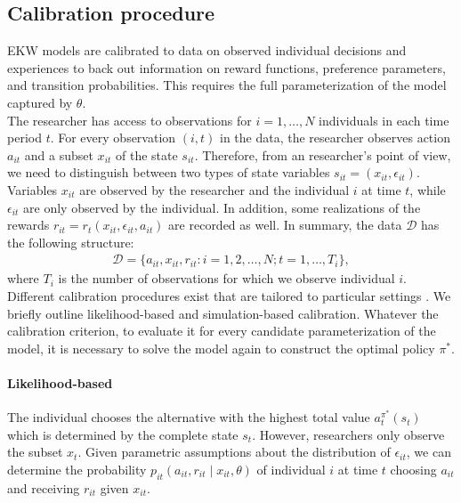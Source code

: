 \subsection{Calibration procedure}\label{Estimation}
EKW models are calibrated to data on observed individual decisions and experiences to back out information on reward functions, preference parameters, and transition probabilities.  This requires the full parameterization of the model captured by $\theta$.\\

\noindent The researcher has access to observations for $i = 1, \hdots, N$ individuals in each time period $t$. For every observation $(i, t)$ in the data, the researcher observes action $a_{it}$ and a subset $x_{it}$ of the state $s_{it}$. Therefore, from an researcher's point of view, we need to distinguish between two types of state variables $s_{it} = (x_{it}, \epsilon_{it})$. Variables $x_{it}$ are observed by the researcher and the individual $i$ at time $t$, while $\epsilon_{it}$ are only observed by the individual. In addition, some realizations of the rewards $r_{it} = r_t(x_{it}, \epsilon_{it}, a_{it})$ are recorded as well. In summary, the data $\mathcal{D}$ has the following structure:
%
\begin{align*}
  \mathcal{D} = \{a_{it}, x_{it}, r_{it}: i = 1,2, \hdots, N; t = 1, \hdots, T_i\},
\end{align*}
where $T_i$ is the number of observations for which we observe individual $i$.\\

\noindent Different calibration procedures exist that are tailored to particular settings \citep{Davidson.2003, Gourieroux.1996}. We briefly outline likelihood-based and simulation-based calibration. Whatever the calibration criterion, to evaluate it for every candidate parameterization of the model, it is necessary to solve the model again to construct the optimal policy $\pi^*$.

\paragraph{Likelihood-based} The individual chooses the alternative with the highest total value $a_t^{\pi^*}(s_t)$ which is determined by the complete state $s_t$. However, researchers only observe the subset $x_t$. Given parametric assumptions about the distribution of $\epsilon_{it}$, we can determine the probability $p_{it}(a_{it}, r_{it} \mid x_{it}, \theta)$ of individual $i$ at time $t$ choosing $a_{it}$ and receiving $r_{it}$ given $x_{it}$.\\

